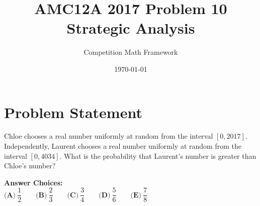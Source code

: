 \documentclass[]{article}
\begin{document}
\title{\textbf{AMC12A 2017 Problem 10\\Strategic Analysis}}
\author{Competition Math Framework}
\date{\today}
\maketitle

\section*{Problem Statement}

Chloe chooses a real number uniformly at random from the interval $[0, 2017]$. Independently, Laurent chooses a real number uniformly at random from the interval $[0, 4034]$. What is the probability that Laurent's number is greater than Chloe's number?

\vspace{0.5em}
\textbf{Answer Choices:}\\
$\textbf{(A)}\ \dfrac{1}{2} \qquad\textbf{(B)}\ \dfrac{2}{3} \qquad\textbf{(C)}\ \dfrac{3}{4} \qquad\textbf{(D)}\ \dfrac{5}{6} \qquad\textbf{(E)}\ \dfrac{7}{8}$
\end{document}
